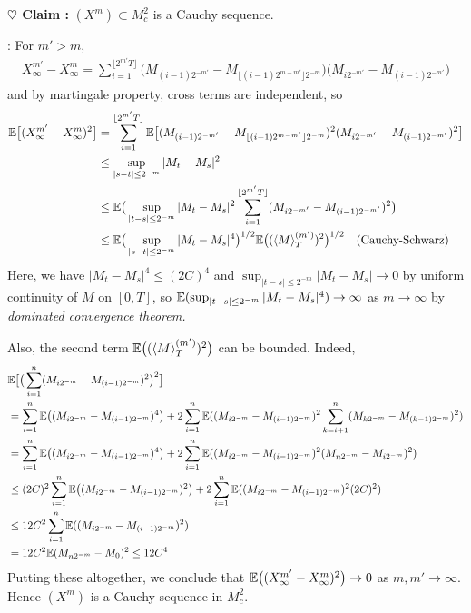 \documentclass[12pt,a4paper]{article}
\newenvironment{proof}
{\begin{changemargin}{0.5cm}{0.5cm} 
	}%
	{\end{changemargin}
}
\newenvironment{subproof}
{\begin{changemargin}{0.5cm}{0.5cm} 
	}%
	{\end{changemargin}
}
\newenvironment{p}
{\begin{proof} 
	}%
	{\end{proof}
}
\begin{document}
\begin{p}
\textbf{$\heartsuit$ Claim :} $(X^m)  \subset M^2_c$ is a Cauchy sequence. 
\begin{subproof}
: For $m' > m$,
\begin{align*}
X^{m'}_{\infty} - X^m_{\infty} = \sum_{i=1}^{\lfloor 2^{m'}T \rfloor} \big( M_{(i-1)2^{-m'}} - M_{\lfloor (i-1) 2^{m-m'} \rfloor 2^{-m}} \big) \big(M_{i2^{-m'}} - M_{(i-1)2^{-m'}}\big)
\end{align*}
and by martingale property, cross terms are independent, so
\begin{align*}
\mathbb{E} \big[ ( X^{m'}_{\infty} - X^m_{\infty})^2 \big] &= \sum_{i=1}^{\lfloor 2^{m'}T \rfloor} \mathbb{E} \big[ (M_{(i-1)2^{-m'}} - M_{\lfloor (i-1)2^{m-m'}\rfloor 2^{-m}} )^2 (M_{i2^{-m'}} - M_{(i-1)2^{-m'}})^2 \big] \\
&\leq \sup_{|s-t|\leq 2^{-m}}|M_t -M_s|^2 \\
& \leq \mathbb{E} \big( \sup_{|t-s|\leq 2^{-m}} |M_t -M_s|^2 \sum_{i=1}^{\lfloor 2^{m'}T \rfloor} (M_{i2^{-m'}} - M_{(i-1)2^{-m'}})^2  \big) \\
& \leq \mathbb{E} \big( \sup_{|s-t|\leq 2^{-m}} |M_t -M_s|^4  \big)^{1/2} \mathbb{E} \big( (\langle M \rangle_T^{(m')})^2 \big)^{1/2} \quad \text{(Cauchy-Schwarz)}
\end{align*}
Here, we have $|M_t -M_s|^4 \leq (2C)^4$ and $\sup_{|t-s|\leq 2^{-m}} |M_t -M_s| \rightarrow 0$ by uniform continuity of $M$ on $[0, T]$, so $\mathbb{E} (\sup_{|t-s| \leq 2^{-m}} |M_t - M_s|^4) \rightarrow \infty$ as $m\rightarrow \infty$ by \emph{dominated convergence theorem.}

\quad Also, the second term $\mathbb{E} \big( (\langle M \rangle_T^{(m')})^2 \big)$ can be bounded. Indeed,
\begin{align*}
& \mathbb{E} \big[ \big( \sum_{i=1}^n (M_{i2^{-m}} - M_{(i-1)2^{-m}})^2 \big)^2 \big] \\
&= \sum_{i=1}^n \mathbb{E} \big( (M_{i2^{-m}} - M_{(i-1)2^{-m}})^4 \big) + 2\sum_{i=1}^n \mathbb{E} ((M_{i2^{-m}} - M_{(i-1)2^{-m}})^2 \sum_{k=i+1}^n (M_{k2^{-m}} - M_{(k-1)2^{-m}})^2 )  \\
&= \sum_{i=1}^n \mathbb{E} \big( (M_{i2^{-m}} - M_{(i-1)2^{-m}})^4 \big) + 2\sum_{i=1}^n \mathbb{E} ((M_{i2^{-m}} - M_{(i-1)2^{-m}})^2 (M_{n2^{-m}} - M_{i2^{-m}})^2 )  \\
&\leq (2C)^2 \sum_{i=1}^n \mathbb{E} \big( (M_{i2^{-m}} - M_{(i-1)2^{-m}})^2 \big) + 2\sum_{i=1}^n \mathbb{E} ((M_{i2^{-m}} - M_{(i-1)2^{-m}} )^2 (2C)^2 ) \\
&\leq 12C^2 \sum_{i=1}^n \mathbb{E} ((M_{i2^{-m}} - M_{(i-1)2^{-m}})^2) \\ 
&= 12C^2 \mathbb{E} (M_{n2^{-m}} - M_0)^2 \leq 12C^4
\end{align*}
Putting these altogether, we conclude that $\mathbb{E} \big( (X_{\infty}^{m'}- X_{\infty}^m)^2 \big) \rightarrow 0$ as $m,m'\rightarrow \infty$. Hence $(X^m)$ is a Cauchy sequence in $M_c^2$.
\end{subproof}


\end{p}
\end{document}
